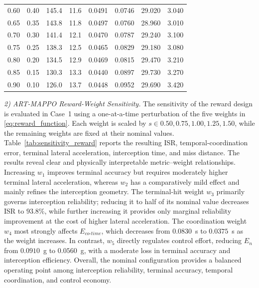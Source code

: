 \documentclass[lettersize,journal]{IEEEtran}
\newcommand{\hladd}[1]{{\color{blue}#1}}
\begin{document}
\begin{table}[!t]
{{\begin{tabular}{@{}cccccccc@{}}
0.60 & 0.40 & 145.4 & 11.6 & 0.0491 & 0.0746 & 29.020 & 3.040 \\
0.65 & 0.35 & 143.8 & 11.8 & 0.0497 & 0.0760 & 28.960 & 3.010 \\
0.70 & 0.30 & 141.4 & 12.1 & 0.0470 & 0.0787 & 29.240 & 3.100 \\
0.75 & 0.25 & 138.3 & 12.5 & 0.0465 & 0.0829 & 29.180 & 3.080 \\
0.80 & 0.20 & 134.5 & 12.9 & 0.0469 & 0.0815 & 29.470 & 3.210 \\
0.85 & 0.15 & 130.3 & 13.3 & 0.0440 & 0.0897 & 29.730 & 3.270 \\
0.90 & 0.10 & 126.0 & 13.7 & 0.0448 & 0.0952 & 29.690 & 3.420 \\
\hline
\end{tabular}%
}}
\end{table}






\hladd{\emph{2) ART-MAPPO Reward-Weight Sensitivity.}
The sensitivity of the reward design is evaluated in Case~1 using a
one-at-a-time perturbation of the five weights in
\eqref{eq:reward_function}. Each weight is scaled by
$s\in{0.50,0.75,1.00,1.25,1.50}$, while the remaining weights are fixed at
their nominal values. Table~\ref{tab:sensitivity_reward} reports the resulting
ISR, temporal-coordination error, terminal lateral acceleration, interception time, and
miss distance. The results reveal clear and physically interpretable
metric--weight relationships. Increasing $w_1$ improves terminal accuracy but
requires moderately higher terminal lateral acceleration, whereas $w_2$ has a comparatively
mild effect and mainly refines the interception geometry. The terminal-hit
weight $w_3$ primarily governs interception reliability; reducing it to half
of its nominal value decreases ISR to $93.8\%$, while further increasing it
provides only marginal reliability improvement at the cost of higher lateral acceleration.
The coordination weight $w_4$ most strongly affects
$E_{co\text{-}time}$, which decreases from $0.0830$~s to $0.0375$~s as the
weight increases. In contrast, $w_5$ directly regulates control effort,
reducing $E_n$ from $0.0910$~g to $0.0560$~g, with a moderate loss in terminal
accuracy and interception efficiency. Overall, the nominal configuration
provides a balanced operating point among interception reliability, terminal
accuracy, temporal coordination, and control economy.}
\end{document}
